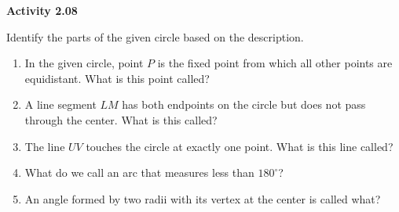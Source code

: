 \vspace{0.3ex}
\noindent\textbf{Activity 2.08}

\vspace{0.2ex}

Identify the parts of the given circle based on the description.

\begin{enumerate}
    \item In the given circle, point $P$ is the fixed point from which all other points are equidistant. What is this point called?
    \item A line segment $LM$ has both endpoints on the circle but does not pass through the center. What is this called?
    \item The line $UV$ touches the circle at exactly one point. What is this line called?
    \item What do we call an arc that measures less than $180^\circ$?
    \item An angle formed by two radii with its vertex at the center is called what?
\end{enumerate}
